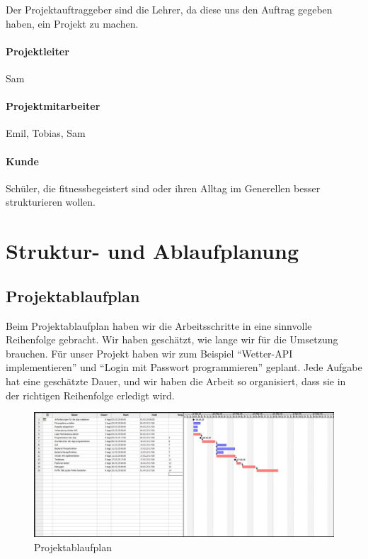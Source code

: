 \documentclass[ngerman]{report}
\begin{document}
Der Projektauftraggeber sind die Lehrer, da diese uns den Auftrag
gegeben haben, ein Projekt zu machen.

\paragraph{Projektleiter}

Sam

\paragraph{Projektmitarbeiter}

Emil, Tobias, Sam

\paragraph{Kunde}

Schüler, die fitnessbegeistert sind oder ihren Alltag im Generellen
besser strukturieren wollen.

\newpage

\section{Struktur- und Ablaufplanung}

\subsection{Projektablaufplan}

Beim Projektablaufplan haben wir die Arbeitsschritte in eine sinnvolle
Reihenfolge gebracht. Wir haben geschätzt, wie lange wir für die
Umsetzung brauchen. Für unser Projekt haben wir zum Beispiel
``Wetter-API implementieren'' und ``Login mit Passwort programmieren''
geplant. Jede Aufgabe hat eine geschätzte Dauer, und wir haben die
Arbeit so organisiert, dass sie in der richtigen Reihenfolge erledigt
wird.

\begin{figure}[H]
\centering
\includegraphics[width=0.8\linewidth]{projektablaufplan.jpg}
\caption{Projektablaufplan}
\end{figure}
\end{document}
